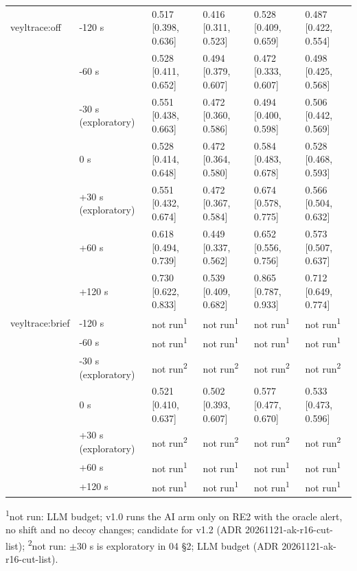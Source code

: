 \begin{table}[t]
\begin{tabular}{@{}llllll@{}}
veyltrace:off & -120 s & 0.517 [0.398, 0.636] & 0.416 [0.311, 0.523] & 0.528 [0.409, 0.659] & 0.487 [0.422, 0.554] \\
 & -60 s & 0.528 [0.411, 0.652] & 0.494 [0.379, 0.607] & 0.472 [0.333, 0.607] & 0.498 [0.425, 0.568] \\
 & -30 s (exploratory) & 0.551 [0.438, 0.663] & 0.472 [0.360, 0.586] & 0.494 [0.400, 0.598] & 0.506 [0.442, 0.569] \\
 & 0 s & 0.528 [0.414, 0.648] & 0.472 [0.364, 0.580] & 0.584 [0.483, 0.678] & 0.528 [0.468, 0.593] \\
 & +30 s (exploratory) & 0.551 [0.432, 0.674] & 0.472 [0.367, 0.584] & 0.674 [0.578, 0.775] & 0.566 [0.504, 0.632] \\
 & +60 s & 0.618 [0.494, 0.739] & 0.449 [0.337, 0.562] & 0.652 [0.556, 0.756] & 0.573 [0.507, 0.637] \\
 & +120 s & 0.730 [0.622, 0.833] & 0.539 [0.409, 0.682] & 0.865 [0.787, 0.933] & 0.712 [0.649, 0.774] \\
veyltrace:brief & -120 s & not run\textsuperscript{1} & not run\textsuperscript{1} & not run\textsuperscript{1} & not run\textsuperscript{1} \\
 & -60 s & not run\textsuperscript{1} & not run\textsuperscript{1} & not run\textsuperscript{1} & not run\textsuperscript{1} \\
 & -30 s (exploratory) & not run\textsuperscript{2} & not run\textsuperscript{2} & not run\textsuperscript{2} & not run\textsuperscript{2} \\
 & 0 s & 0.521 [0.410, 0.637] & 0.502 [0.393, 0.607] & 0.577 [0.477, 0.670] & 0.533 [0.473, 0.596] \\
 & +30 s (exploratory) & not run\textsuperscript{2} & not run\textsuperscript{2} & not run\textsuperscript{2} & not run\textsuperscript{2} \\
 & +60 s & not run\textsuperscript{1} & not run\textsuperscript{1} & not run\textsuperscript{1} & not run\textsuperscript{1} \\
 & +120 s & not run\textsuperscript{1} & not run\textsuperscript{1} & not run\textsuperscript{1} & not run\textsuperscript{1} \\
\hline
\end{tabular}
\par\smallskip\scriptsize\raggedright
\textsuperscript{1}not run: LLM budget; v1.0 runs the AI arm only on RE2 with the oracle alert, no shift and no decoy changes; candidate for v1.2 (ADR 20261121-ak-r16-cut-list); \textsuperscript{2}not run: $\pm$30 s is exploratory in 04 \S{}2; LLM budget (ADR 20261121-ak-r16-cut-list).\par

\end{table}
